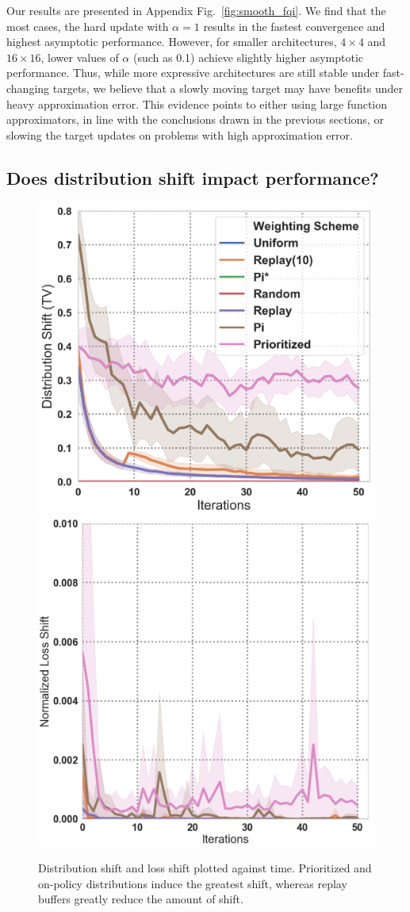 Our results are presented in Appendix Fig.~\ref{fig:smooth_fqi}.
We find that the most cases, the hard update with $\alpha=1$ results in the fastest convergence and highest asymptotic performance. However, for smaller architectures, $4 \times 4$ and $16 \times 16$, lower values of $\alpha$ (such as 0.1) achieve slightly higher asymptotic performance. Thus, while more expressive architectures are still stable under fast-changing targets, we believe that a slowly moving target may have benefits under heavy approximation error. This evidence points to either using large function approximators, in line with the conclusions drawn in the previous sections, or slowing the target updates on problems with high approximation error.

\subsection{Does distribution shift impact performance?}
\label{sec:distr_shift}

\begin{figure}[tb]
\caption{\label{fig:distribution_shift_tv_loss} Distribution shift and loss shift plotted against time. Prioritized and on-policy distributions induce the greatest shift, whereas replay buffers greatly reduce the amount of shift.}
\includegraphics[width=0.51\columnwidth]{chapters/diagnosing_q/images/dist_shift_tv3.pdf}
\includegraphics[width=0.47\columnwidth]{chapters/diagnosing_q/images/dist_shift_loss_tv3.pdf}
\end{figure}


